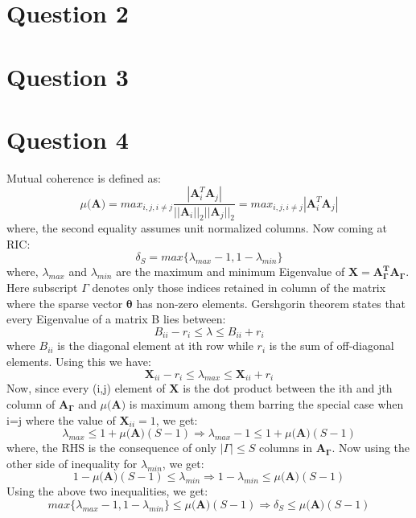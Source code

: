 \documentclass[12pt]{article}
\begin{document}
\section*{Question 2}


\section*{Question 3}


\section*{Question 4}
Mutual coherence is defined as:
\begin{equation*}
    \mu(\boldsymbol{A)} = max_{i, j, i \neq j}\frac{|\boldsymbol{A}_i^T\boldsymbol{A}_j|}{||\boldsymbol{A}_i||_2||\boldsymbol{A}_j||_2} = max_{i, j, i \neq j}|\boldsymbol{A}_i^T\boldsymbol{A}_j| 
\end{equation*}
where, the second equality assumes unit normalized columns.
Now coming at RIC:
\begin{equation*}
    \delta_S = max\{\lambda_{max}-1, 1-\lambda_{min}\}
\end{equation*}
where, $\lambda_{max}$ and $\lambda_{min}$ are the maximum and minimum Eigenvalue of $\boldsymbol{X} = \boldsymbol{A_{\Gamma}^TA_{\Gamma}}$. Here subscript $\Gamma$ denotes only those indices retained in column of the matrix where the sparse vector $\boldsymbol{\theta}$ has non-zero elements. 
Gershgorin theorem states that every Eigenvalue of a matrix B lies between:
\begin{equation*}
    B_{ii}-r_i \leq \lambda \leq B_{ii}+r_i
\end{equation*}
where $B_{ii}$ is the diagonal element at ith row while $r_i$ is the sum of off-diagonal elements. Using this we have:
\begin{equation*}
    \boldsymbol{X}_{ii}-r_i \leq \lambda_{max} \leq \boldsymbol{X}_{ii}+r_i
\end{equation*}
Now, since every (i,j) element of $\boldsymbol{X}$ is the dot product between the ith and jth column of $\boldsymbol{A_{\Gamma}}$ and $\mu(\boldsymbol{A)}$ is maximum among them barring the special case when i=j where the value of $\boldsymbol{X}_{ii} = 1$, we get:
\begin{equation*}
     \lambda_{max} \leq 1+\mu(\boldsymbol{A)}(S-1) \Longrightarrow \lambda_{max}-1 \leq 1+\mu(\boldsymbol{A)}(S-1)
\end{equation*}
where, the RHS is the consequence of only $|\Gamma| \leq S$ columns in $\boldsymbol{A_{\Gamma}}$. Now using the other side of inequality for $\lambda_{min}$, we get:
\begin{equation*}
  1-\mu(\boldsymbol{A)}(S-1) \leq \lambda_{min} \Longrightarrow 1-\lambda_{min} \leq \mu(\boldsymbol{A)}(S-1)
\end{equation*}
Using the above two inequalities, we get:
\begin{equation*}
  max\{\lambda_{max}-1, 1-\lambda_{min}\} \leq \mu(\boldsymbol{A)}(S-1) \Longrightarrow \delta_S \leq \mu(\boldsymbol{A)}(S-1)
\end{equation*}
\end{document}
